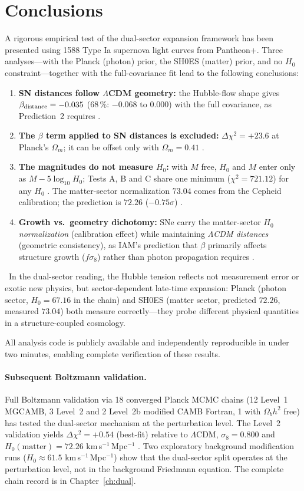 \section{Conclusions}\label{sec:dsv_conclusions}
A rigorous empirical test of the dual-sector expansion framework has been presented using 1588 Type Ia supernova light curves from Pantheon+. Three analyses---with
the Planck (photon) prior, the SH0ES (matter) prior, and no $H_0$ constraint---together with the full-covariance fit lead to the following conclusions:
\begin{enumerate}
\item \textbf{SN distances follow $\Lambda$CDM geometry:} the Hubble-flow shape gives $\beta_{\rm distance}=-0.035$ ($68\,\%$: $-0.068$ to $0.000$) with
the full covariance, as Prediction~2 requires \observed.
\item \textbf{The $\beta$ term applied to SN distances is excluded:} $\Delta\chi^2=+23.6$ at Planck's $\Omega_m$; it can be offset only with $\Omega_m=0.41$
\calc.
\item \textbf{The magnitudes do not measure $H_0$:} with $M$ free, $H_0$ and $M$ enter only as $M-5\log_{10}H_0$; Tests A, B and C share one minimum
($\chi^2=721.12$) for any $H_0$ \derived. The matter-sector normalization $73.04$ comes from the Cepheid calibration; the prediction is $72.26$
($-0.75\sigma$) \observed.
\item \textbf{Growth vs.\ geometry dichotomy:} SNe carry the matter-sector \emph{$H_0$ normalization} (calibration effect) while maintaining
\emph{$\Lambda$CDM distances} (geometric consistency), as IAM's prediction that $\beta$ primarily affects structure growth ($f\sigma_8$) rather than
photon propagation requires \interp.
\end{enumerate}
\interp\ In the dual-sector reading, the Hubble tension reflects not measurement error or exotic new physics, but sector-dependent late-time expansion:
Planck (photon sector, $H_0=67.16$ in the chain) and SH0ES (matter sector, predicted $72.26$, measured $73.04$) both measure correctly---they probe different physical quantities
in a structure-coupled cosmology.

All analysis code is publicly available and independently reproducible in under two minutes, enabling complete verification of these results.

\paragraph{Subsequent Boltzmann validation.} Full Boltzmann validation via 18 converged Planck MCMC chains (12 Level~1 MGCAMB, 3 Level~2 and 2 Level~2b modified CAMB Fortran, 1 with $\Omega_bh^2$ free)
has tested the dual-sector mechanism at the perturbation level. The Level~2 validation yields $\Delta\chi^2=+0.54$ (best-fit) relative to $\Lambda$CDM,
$\sigma_8=0.800$ and $H_0(\mathrm{matter})=72.26$ km\,s$^{-1}$\,Mpc$^{-1}$ \measured. Two exploratory background modification runs ($H_0\approx61.5$
km\,s$^{-1}$\,Mpc$^{-1}$) show that the dual-sector split operates at the perturbation level, not in the background Friedmann equation. The complete
chain record is in Chapter~\ref{ch:dual}.

